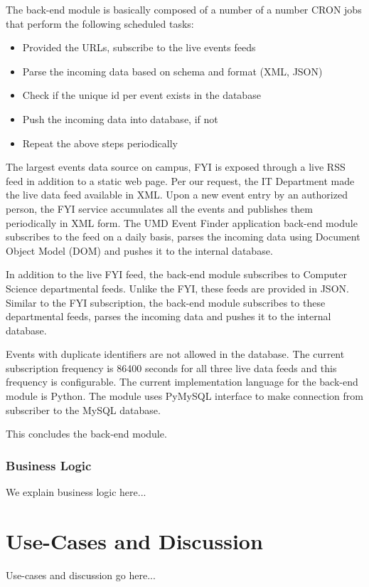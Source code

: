 \documentclass{acm_proc_article-sp}
\begin{document}
The back-end module is basically composed of a number of a number CRON jobs that perform the following scheduled tasks:

\begin{itemize}
\item Provided the URLs, subscribe to the live events feeds 
\item Parse the incoming data based on schema and format (XML, JSON)
\item Check if the unique id per event exists in the database
\item Push the incoming data into database, if not
\item Repeat the above steps periodically
\end{itemize}

The largest events data source on campus, FYI is exposed through a live RSS feed in addition to a static web page. Per our request, the IT Department made the live data feed available in XML. Upon a new event entry by an authorized person, the FYI service accumulates all the events and publishes them periodically in XML form. The UMD Event Finder application back-end module subscribes to the feed on a daily basis, parses the incoming data using Document Object Model (DOM) and pushes it to the internal database. 

In addition to the live FYI feed, the back-end module subscribes to Computer Science departmental feeds. Unlike the FYI, these feeds are provided in JSON. Similar to the FYI subscription, the back-end module subscribes to these departmental feeds, parses the incoming data and pushes it to the internal database.

Events with duplicate identifiers are not allowed in the database. The current subscription frequency is 86400 seconds for all three live data feeds and this frequency is configurable. The current implementation language for the back-end module is Python. The module uses PyMySQL interface to make connection from subscriber to the MySQL database.

This concludes the back-end module.

\subsubsection{Business Logic}
We explain business logic here...

\section{Use-Cases and Discussion}
Use-cases and discussion go here...
\end{document}

